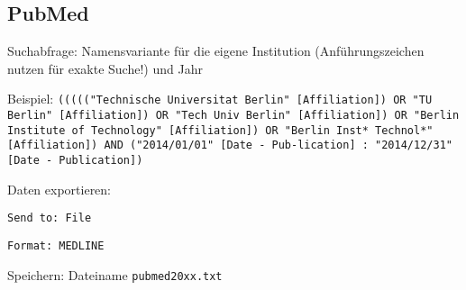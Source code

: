 \subsection*{PubMed}
\begin{compactitem}
\item Suchabfrage: Namensvariante für die eigene Institution (Anführungszeichen nutzen für exakte Suche!) und Jahr 
	\begin{compactitem}
    \item Beispiel: \texttt{((((("{}Technische Universitat Berlin"{} [Affiliation]) OR \newline "{}TU Berlin"{} [Affiliation]) OR "{}Tech Univ Berlin"{} [Affiliation]) \newline OR "{}Berlin Institute of Technology"{} [Affiliation]) OR "{}Berlin \newline Inst* Technol*"{} [Affiliation]) AND ("{}2014/01/01"{} [Date - Pub-\newline lication] : "{}2014/12/31"{} [Date - Publication])}
    \end{compactitem}
\item Daten exportieren: 
	\begin{compactitem}
    \item \texttt{Send to: File}
    \item \texttt{Format: MEDLINE}
    \end{compactitem}
\item Speichern: Dateiname \texttt{pubmed20xx.txt}
\end{compactitem}

